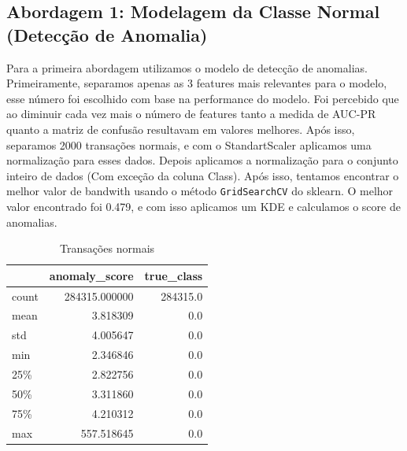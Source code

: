 \documentclass[conference]{IEEEtran}
\begin{document}
\subsection{Abordagem 1: Modelagem da Classe Normal (Detecção de Anomalia)}
\label{subsec:abordagem1}
  Para a primeira abordagem utilizamos o modelo de detecção de anomalias. Primeiramente, separamos apenas as 3 features mais relevantes para o modelo, esse número foi escolhido com base na performance do modelo. Foi percebido que ao diminuir cada vez mais o número de features tanto a medida de AUC-PR quanto a matriz de confusão resultavam em valores melhores. Após isso, separamos 2000 transações normais, e com o StandartScaler aplicamos uma normalização para esses dados. Depois aplicamos a normalização para o conjunto inteiro de dados (Com exceção da coluna Class). Após isso, tentamos encontrar o melhor valor de bandwith usando o método \texttt{GridSearchCV} do sklearn. O melhor valor encontrado foi 0.479, e com isso aplicamos um KDE e calculamos o score de anomalias.
\begin{table}[tb]
    \caption{Transações normais}
    \label{tab:score_anomalia_normal}
    \centering
    \begin{tabular}{lrr}
        \toprule
        & \textbf{anomaly\_score} & \textbf{true\_class} \\
        \midrule
        count & 284315.000000 & 284315.0 \\
        mean & 3.818309 & 0.0 \\
        std & 4.005647 & 0.0 \\
        min & 2.346846 & 0.0 \\
        25\% & 2.822756 & 0.0 \\
        50\% & 3.311860 & 0.0 \\
        75\% & 4.210312 & 0.0 \\
        max & 557.518645 & 0.0 \\
        \bottomrule
    \end{tabular}
\end{table}
\end{document}
